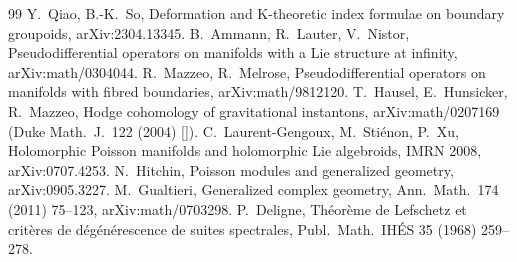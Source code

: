 \begin{thebibliography}{99}
 Y.\ Qiao, B.-K.\ So, Deformation and K-theoretic index formulae on boundary groupoids, arXiv:2304.13345.
 B.\ Ammann, R.\ Lauter, V.\ Nistor, Pseudodifferential operators on manifolds with a Lie structure at infinity, arXiv:math/0304044.
 R.\ Mazzeo, R.\ Melrose, Pseudodifferential operators on manifolds with fibred boundaries, arXiv:math/9812120.
 T.\ Hausel, E.\ Hunsicker, R.\ Mazzeo, Hodge cohomology of gravitational instantons, arXiv:math/0207169 (Duke Math.\ J.\ 122 (2004) [\tQ]).
 C.\ Laurent-Gengoux, M.\ Sti\'enon, P.\ Xu, Holomorphic Poisson manifolds and holomorphic Lie algebroids, IMRN 2008, arXiv:0707.4253.
 N.\ Hitchin, Poisson modules and generalized geometry, arXiv:0905.3227.
 M.\ Gualtieri, Generalized complex geometry, Ann.\ Math.\ 174 (2011) 75--123, arXiv:math/0703298.
 P.\ Deligne, Th\'eor\`eme de Lefschetz et crit\`eres de d\'eg\'en\'erescence de suites spectrales, Publ.\ Math.\ IH\'ES 35 (1968) 259--278.
\end{thebibliography}
